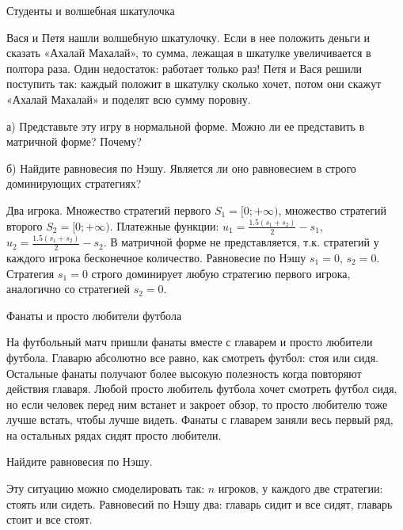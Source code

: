\begin{problem}
 Студенты и волшебная шкатулочка \par
Вася и Петя нашли волшебную шкатулочку. Если в нее положить деньги и сказать «Ахалай Махалай», то сумма, лежащая в шкатулке увеличивается в полтора раза. Один недостаток: работает только раз! Петя и Вася решили поступить так: каждый положит в шкатулку сколько хочет, потом они скажут «Ахалай Махалай» и поделят всю сумму поровну.\par
а)	Представьте эту игру в нормальной форме. Можно ли ее представить в матричной форме? Почему?\par
б)	Найдите равновесия по Нэшу. Является ли оно равновесием в строго доминирующих стратегиях?




\begin{sol}
Два игрока. Множество стратегий первого $S_{1}=[0;+\infty)$, множество стратегий второго $S_{2}=[0;+\infty)$. Платежные функции: $u_{1}=\frac{1.5(s_{1}+s_{2})}{2}-s_{1}$,  $u_{2}=\frac{1.5(s_{1}+s_{2})}{2}-s_{2}$. В матричной форме не представляется, т.к. стратегий у каждого игрока бесконечное количество. Равновесие по Нэшу $s_{1}=0$, $s_{2}=0$. Стратегия $s_{1}=0$ строго доминирует любую стратегию первого игрока, аналогично со стратегией $s_{2}=0$.
\end{sol}
\end{problem}





\begin{problem}
 Фанаты и просто любители футбола \par
На футбольный матч пришли фанаты вместе с главарем и просто любители футбола. Главарю абсолютно все равно, как смотреть футбол: стоя или сидя. Остальные фанаты получают более высокую полезность когда повторяют действия главаря. Любой просто любитель футбола хочет смотреть футбол сидя, но если человек перед ним встанет и закроет обзор, то просто любителю тоже лучше встать, чтобы лучше видеть. Фанаты с главарем заняли весь первый ряд, на остальных рядах сидят просто любители.\par
Найдите равновесия по Нэшу.



\begin{sol}
Эту ситуацию можно смоделировать так: $n$ игроков, у каждого две стратегии: стоять или сидеть. Равновесий по Нэшу два: главарь сидит и все сидят, главарь стоит и все стоят.
\end{sol}
\end{problem}



